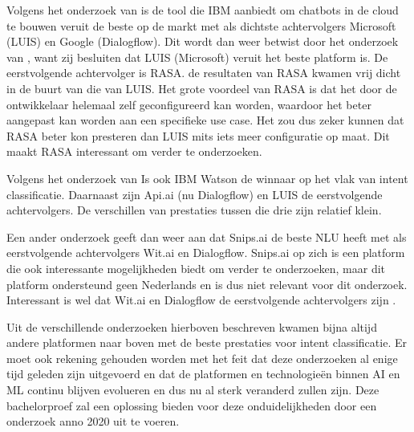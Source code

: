 Volgens het onderzoek van \textcite{Russis2018} is de tool die IBM aanbiedt om chatbots in de cloud te bouwen veruit de beste op de markt met als dichtste achtervolgers Microsoft (LUIS) en Google (Dialogflow). Dit wordt dan weer betwist door het onderzoek van \textcite{Langen2017}, want zij besluiten dat LUIS (Microsoft) veruit het beste platform is. De eerstvolgende achtervolger is RASA. de resultaten van RASA kwamen vrij dicht in de buurt van die van LUIS. Het grote voordeel van RASA is dat het door de ontwikkelaar helemaal zelf geconfigureerd kan worden, waardoor het beter aangepast kan worden aan een specifieke use case. Het zou dus zeker kunnen dat RASA beter kon presteren dan LUIS mits iets meer configuratie op maat. Dit maakt RASA interessant om verder te onderzoeken.

Volgens het onderzoek van \textcite{Savenkov2017} Is ook IBM Watson de winnaar op het vlak van intent classificatie. Daarnaast zijn Api.ai (nu Dialogflow) en LUIS de eerstvolgende achtervolgers. De verschillen van prestaties tussen die drie zijn relatief klein.

Een ander onderzoek geeft dan weer aan dat Snips.ai de beste NLU heeft met als eerstvolgende achtervolgers Wit.ai en Dialogflow. Snips.ai op zich is een platform die ook interessante mogelijkheden biedt om verder te onderzoeken, maar dit platform ondersteund geen Nederlands en is dus niet relevant voor dit onderzoek. Interessant is wel dat Wit.ai en Dialogflow de eerstvolgende achtervolgers zijn \autocite{Coucke2017}.

Uit de verschillende onderzoeken hierboven beschreven kwamen bijna altijd andere platformen naar boven met de beste prestaties voor intent classificatie. Er moet ook rekening gehouden worden met het feit dat deze onderzoeken al enige tijd geleden zijn uitgevoerd en dat de platformen en technologieën binnen AI en ML continu blijven evolueren en dus nu al sterk veranderd zullen zijn. Deze bachelorproef zal een oplossing bieden voor deze onduidelijkheden door een onderzoek anno 2020 uit te voeren.

















